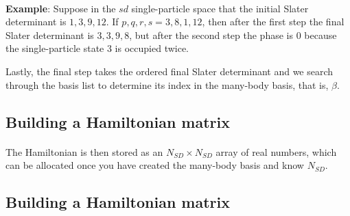 \paragraph{}

\textbf{Example}: Suppose in the $sd$ single-particle space that the initial 
Slater determinant
is $1,3,9,12$. If $p,q,r,s = 3,8,1,12$, then after the first step the 
final  Slater determinant
is $3,3,9,8$, but after the second step the phase is 0 
because the single-particle state 3 is
occupied twice.

Lastly, the final step  takes the ordered final Slater determinant and 
we search through the basis list to
determine its index in the many-body basis, that is, $\beta$.



\subsection*{Building a Hamiltonian matrix}

\paragraph{}

The Hamiltonian is then stored as an $N_{SD} \times N_{SD}$ array of real numbers, which
can be allocated once you have created the many-body basis and know $N_{SD}$.



\subsection*{Building a Hamiltonian matrix}

\paragraph{}

